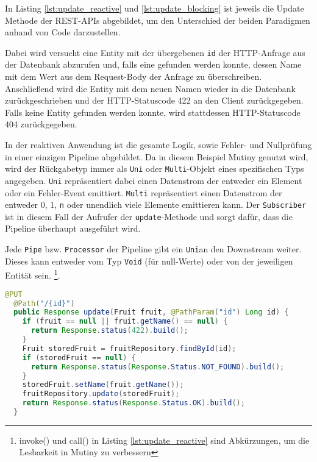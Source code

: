 In Listing \ref{lst:update_reactive} und \ref{lst:update_blocking} ist jeweils die Update Methode der REST-APIs abgebildet, um den
Unterschied der beiden Paradigmen anhand von Code darzustellen.

Dabei wird versucht eine Entity mit der übergebenen \verb|id| der HTTP-Anfrage
aus der Datenbank abzurufen und, falls eine gefunden werden konnte, dessen Name mit dem Wert
aus dem Request-Body der Anfrage zu überschreiben. Anschließend wird die Entity mit dem neuen Namen wieder in die Datenbank zurückgeschrieben
und der HTTP-Statuscode 422 an den Client zurückgegeben. Falls keine Entity gefunden werden konnte, wird stattdessen
HTTP-Statuscode 404 zurückgegeben.

In der reaktiven Anwendung ist die gesamte Logik, sowie Fehler- und Nullprüfung in einer einzigen Pipeline abgebildet.
Da in diesem Beispiel Mutiny genutzt wird, wird der Rückgabetyp immer als \verb|Uni| oder \verb|Multi|-Objekt eines spezifischen Typs
angegeben. \verb|Uni| repräsentiert dabei einen Datenstrom der entweder ein Element oder ein Fehler-Event emittiert.
\verb|Multi| repräsentiert einen Datenstrom der entweder 0, 1, \verb|n| oder unendlich viele Elemente emittieren kann.
Der \verb|Subscriber| ist in diesem Fall der Aufrufer der \verb|update|-Methode und sorgt dafür, dass die Pipeline überhaupt ausgeführt wird.

Jede \verb|Pipe| bzw. \verb|Processor| der Pipeline gibt ein \verb|Uni|an den Downstream weiter.
Dieses kann entweder vom Typ \verb|Void| (für null-Werte) oder von der jeweiligen Entität sein.
\footnote{invoke() und call() in Listing \ref{lst:update_reactive} sind Abkürzungen, um die Lesbarkeit in Mutiny zu verbessern\parencite{MutinyShortcuts}}.

\begin{lstlisting}[caption=Update Methode der nicht-reaktiven Anwendung, language=Java, captionpos=b, label=lst:update_blocking]
  @PUT
  @Path("/{id}")
  public Response update(Fruit fruit, @PathParam("id") Long id) {
    if (fruit == null || fruit.getName() == null) {
      return Response.status(422).build();
    }
    Fruit storedFruit = fruitRepository.findById(id);
    if (storedFruit == null) {
      return Response.status(Response.Status.NOT_FOUND).build();
    }
    storedFruit.setName(fruit.getName());
    fruitRepository.update(storedFruit);
    return Response.status(Response.Status.OK).build();
  }
\end{lstlisting}

